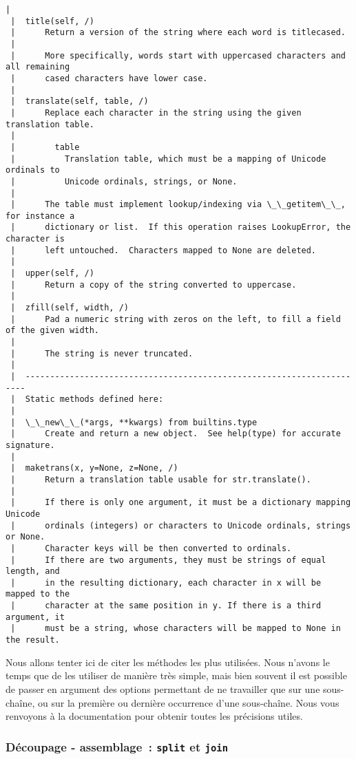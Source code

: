 \begin{Verbatim}[commandchars=\\\{\},frame=single,framerule=0.3mm,rulecolor=\color{cellframecolor}]
 |  
 |  title(self, /)
 |      Return a version of the string where each word is titlecased.
 |      
 |      More specifically, words start with uppercased characters and all remaining
 |      cased characters have lower case.
 |  
 |  translate(self, table, /)
 |      Replace each character in the string using the given translation table.
 |      
 |        table
 |          Translation table, which must be a mapping of Unicode ordinals to
 |          Unicode ordinals, strings, or None.
 |      
 |      The table must implement lookup/indexing via \_\_getitem\_\_, for instance a
 |      dictionary or list.  If this operation raises LookupError, the character is
 |      left untouched.  Characters mapped to None are deleted.
 |  
 |  upper(self, /)
 |      Return a copy of the string converted to uppercase.
 |  
 |  zfill(self, width, /)
 |      Pad a numeric string with zeros on the left, to fill a field of the given width.
 |      
 |      The string is never truncated.
 |  
 |  ----------------------------------------------------------------------
 |  Static methods defined here:
 |  
 |  \_\_new\_\_(*args, **kwargs) from builtins.type
 |      Create and return a new object.  See help(type) for accurate signature.
 |  
 |  maketrans(x, y=None, z=None, /)
 |      Return a translation table usable for str.translate().
 |      
 |      If there is only one argument, it must be a dictionary mapping Unicode
 |      ordinals (integers) or characters to Unicode ordinals, strings or None.
 |      Character keys will be then converted to ordinals.
 |      If there are two arguments, they must be strings of equal length, and
 |      in the resulting dictionary, each character in x will be mapped to the
 |      character at the same position in y. If there is a third argument, it
 |      must be a string, whose characters will be mapped to None in the result.
\end{Verbatim}

    Nous allons tenter ici de citer les méthodes les plus utilisées. Nous
n'avons le temps que de les utiliser de manière très simple, mais bien
souvent il est possible de passer en argument des options permettant de
ne travailler que sur une sous-chaîne, ou sur la première ou dernière
occurrence d'une sous-chaîne. Nous vous renvoyons à la documentation
pour obtenir toutes les précisions utiles.

    \hypertarget{duxe9coupage---assemblage-split-et-join}{%
\subsubsection{\texorpdfstring{Découpage - assemblage~: \texttt{split}
et
\texttt{join}}{Découpage - assemblage~: split et join}}\label{duxe9coupage---assemblage-split-et-join}}

